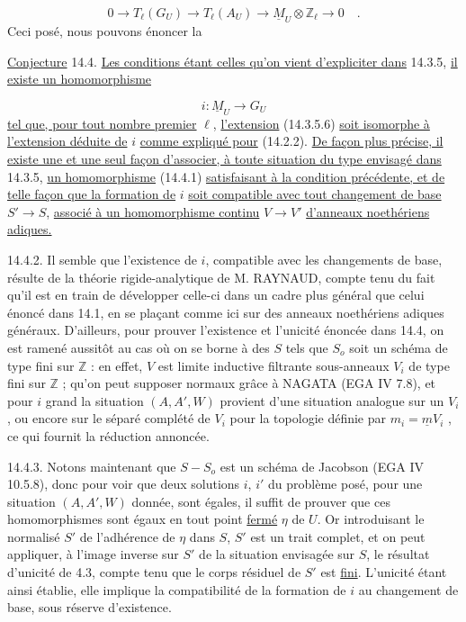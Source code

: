 \begin{equation}\tag{14.3.5.6}
0 \longrightarrow T_\ell(G_U) \longrightarrow T_\ell(A_U) \longrightarrow \underline{M}_U \otimes \mathbb{Z}_\ell \longrightarrow 0 \quad .
\end{equation}
Ceci posé, nous pouvons énoncer la



\underline{Conjecture} 14.4. \underline{Les conditions étant celles qu'on vient d'expliciter dans} 14.3.5, \underline{il existe un homomorphisme}

\begin{equation}\tag{14.4.1}
i : \underline{M}_U \longrightarrow G_U
\end{equation}
\underline{tel que, pour tout nombre premier} $\ell$, \underline{l'extension} (14.3.5.6) \underline{soit isomorphe à l'extension déduite de} $i$ \underline{comme expliqué pour} (14.2.2). \underline{De façon plus précise, il existe une et une seul façon d'associer, à toute situation du type envisagé dans} 14.3.5, \underline{un homomorphisme} (14.4.1) \underline{satisfaisant à la condition précédente, et de telle façon que la formation de} $i$ \underline{soit compatible avec tout changement de base} $S' \longrightarrow S$, \underline{associé à un homomorphisme continu} $V \longrightarrow V'$ \underline{d'anneaux noethériens adiques.}

14.4.2. Il semble que l'existence de $i$, compatible avec les changements de base, résulte de la théorie rigide-analytique de M. RAYNAUD, compte tenu du fait qu'il est en train de développer celle-ci dans un cadre plus général que celui énoncé dans 14.1, en se plaçant comme ici sur des anneaux noethériens adiques généraux. D'ailleurs, pour prouver l'existence et l'unicité énoncée dans 14.4, on est ramené aussitôt au cas où on se borne à des $S$ tels que $S_o$ soit un schéma de type fini sur $\mathbb{Z}$ : en effet, $V$ est limite inductive filtrante sous-anneaux $V_i$ de type fini sur $\mathbb{Z}$ ; qu'on peut supposer normaux grâce à NAGATA (EGA IV 7.8), et pour $i$ grand la situation $(A,A',W)$ provient d'une situation analogue sur un $V_i$, ou encore sur le séparé complété de $V_i$ pour la topologie définie par $m_i = \underline{m} V_i$ , ce qui fournit la réduction annoncée.



14.4.3. Notons maintenant que $S-S_o$ est un schéma de Jacobson (EGA IV 10.5.8), donc pour voir que deux solutions $i$, $i'$ du problème posé, pour une situation $(A,A',W)$ donnée, sont égales, il suffit de prouver que ces homomorphismes sont égaux en tout point \underline{fermé} $\eta$ de $U$. Or introduisant le normalisé $S'$ de l'adhérence de $\eta$ dans $S$, $S'$ est un trait complet, et on peut appliquer, à l'image inverse sur $S'$ de la situation envisagée sur $S$, le résultat d'unicité de 4.3, compte tenu que le corps résiduel de $S'$ est \underline{fini}. L'unicité étant ainsi établie, elle implique la compatibilité de la formation de $i$ au changement de base, sous réserve d'existence.

